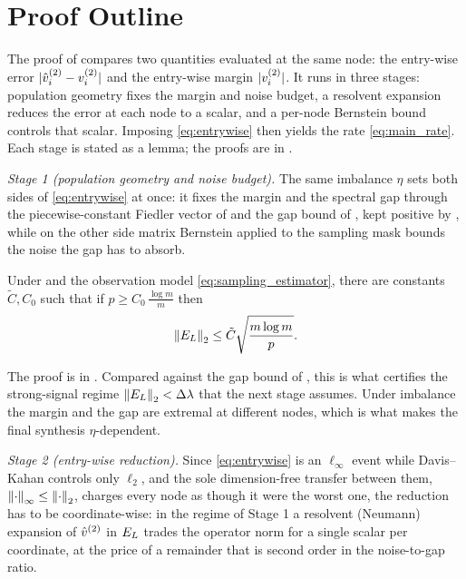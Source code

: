 \section{Proof Outline}\label{sec:outline}
The proof of  compares two quantities evaluated at the same
node: the entry-wise error $|\hat v^{(2)}_i-v^{(2)}_i|$ and the entry-wise margin $|v^{(2)}_i|$.
It runs in three stages: population geometry fixes the margin and noise
budget, a resolvent expansion reduces the error at each node to a scalar, and a
per-node Bernstein bound controls that scalar. Imposing
\eqref{eq:entrywise} then yields the rate \eqref{eq:main_rate}. Each stage is stated
as a lemma; the proofs are in .

\emph{Stage 1 (population geometry and noise budget).} The same imbalance $\eta$
sets both sides of \eqref{eq:entrywise} at once: it fixes the margin and the
spectral gap through the piecewise-constant Fiedler vector of
 and the gap bound of , kept positive by
, while on the other side matrix Bernstein applied to the
sampling mask bounds the noise the gap has to absorb.

\begin{lemma}\label{lem:B-bernstein}
Under  and the observation model
\eqref{eq:sampling_estimator}, there are constants $\tilde C,C_0$
such that if $p\ge C_0\,\tfrac{\log m}{m}$ then \hp
\[
   \left\lVert E_{L} \right\rVert_{2}\le\tilde C\sqrt{\frac{m\log m}{p}}.
\]
\end{lemma}
\noindent The proof is in . Compared against the gap bound of
, this is what certifies the strong-signal regime
$\left\lVert E_{L} \right\rVert_{2}<\Delta\lambda$ that the next stage assumes. Under imbalance the margin and
the gap are extremal at different nodes, which is what makes the final synthesis
$\eta$-dependent.

\emph{Stage 2 (entry-wise reduction).} Since \eqref{eq:entrywise} is an
$\ell_\infty$ event while Davis--Kahan controls only $\ell_2$, and the sole
dimension-free transfer between them, $\left\lVert \cdot \right\rVert_\infty\le\left\lVert \cdot \right\rVert_2$,
charges every node as though it were the worst one, the reduction has to be
coordinate-wise: in the regime of Stage 1 a resolvent (Neumann) expansion of
$\hat v^{(2)}$ in $E_{L}$ trades the operator norm for a single scalar per coordinate, at
the price of a remainder that is second order in the noise-to-gap ratio.

